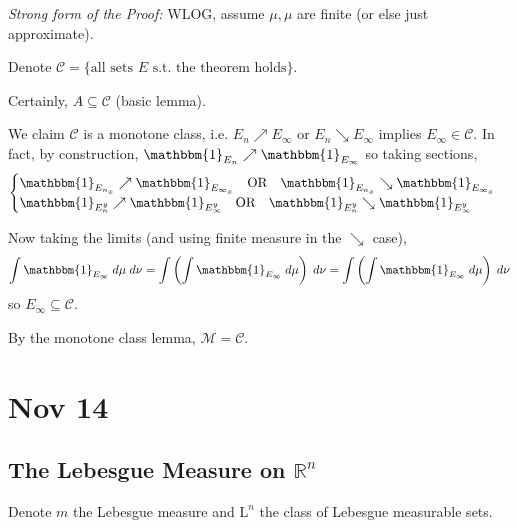 \documentclass[12pt]{report}
\newcommand{\R}{\mathbb{R}}
\newcommand{\ind}{\mathbbm{1}}
\newcommand{\Cc}{\mathcal{C}}
\newcommand{\M}{\mathcal{M}}
\renewcommand{\L}{\text{L}}
\newcommand{\sub}{\subseteq}
\newenvironment*{tbox}[2][gray]{
    \begin{tcolorbox}[
        parbox=false,
        colback=#1!5!white,
        colframe=#1!75!black,
        breakable,
        title={#2}
    ]}
    {\end{tcolorbox}}
\begin{document}
    \begin{tbox}{\textbf{Tonelli Theorem}: 
        \[\int \ind_E \; d\mu \; d\nu = \int \left(\int \ind_E \; d\mu\right) \; d\nu = \int \left(\int \ind_E \; d\mu\right) \; d\nu\]}
        \emph{Strong form of the Proof:} WLOG, assume $\mu, \mu$ are finite (or else just approximate). 
        
        Denote $\Cc = \{\text{all sets } E \text{ s.t. the theorem holds}\}$.

        Certainly, $A \sub \Cc$ (basic lemma). 

        We claim $\Cc$ is a monotone class, i.e. $E_n \nearrow E_{\infty}$ or $E_n \searrow E_{\infty}$ implies $E_{\infty} \in \Cc$. In fact, by construction, $\ind_{E_n} \nearrow \ind_{E_{\infty}}$ so taking sections, 
        \[\begin{cases}
            \ind_{E_{n_x}} \nearrow \ind_{E_{\infty_x}} \quad \text{OR} \quad \ind_{E_{n_x}} \searrow \ind_{E_{\infty_x}}\\ 
            \ind_{E_{n}^y} \nearrow \ind_{E_{\infty}^y} \quad \text{OR} \quad \ind_{E_n^y} \searrow \ind_{E_{\infty}^y}
        \end{cases}\]
        
        Now taking the limits (and using finite measure in the $\searrow$ case), 
        \[\int \ind_{E_{\infty}} \; d\mu \; d\nu = \int \left(\int \ind_{E_{\infty}} \; d\mu\right) \; d\nu = \int \left(\int \ind_{E_{\infty}} \; d\mu\right) \; d\nu\] 
        so $E_{\infty} \sub \Cc$. 

        By the monotone class lemma, $\M = \Cc$. 

    \end{tbox}

\section*{Nov 14}
\subsection*{The Lebesgue Measure on $\R^n$}
    Denote $m$ the Lebesgue measure and $\L^n$ the class of Lebesgue measurable sets.
\end{document}
